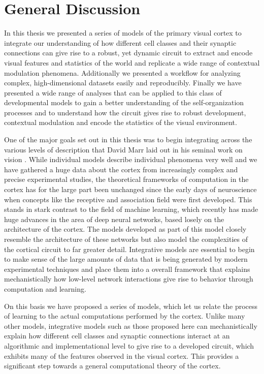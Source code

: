 \chapter{General Discussion}

In this thesis we presented a series of models of the primary visual
cortex to integrate our understanding of how different cell classes
and their synaptic connections can give rise to a robust, yet dynamic
circuit to extract and encode visual features and statistics of the
world and replicate a wide range of contextual modulation
phenomena. Additionally we presented a workflow for analyzing complex,
high-dimensional datasets easily and reproducibly. Finally we have
presented a wide range of analyses that can be applied to this class
of developmental models to gain a better understanding of the
self-organization processes and to understand how the circuit gives
rise to robust development, contextual modulation and encode the
statistics of the visual environment.

One of the major goals set out in this thesis was to begin integrating
across the various levels of description that David Marr laid out in
his seminal work on vision \citep{Marr1982}. While individual models
describe individual phenomena very well and we have gathered a huge
data about the cortex from increasingly complex and precise
experimental studies, the theoretical frameworks of computation in the
cortex has for the large part been unchanged since the early days of
neuroscience when concepts like the receptive and association field
were first developed. This stands in stark contrast to the field of
machine learning, which recently has made huge advances in the area of
deep neural networks, based losely on the architecture of the
cortex. The models developed as part of this model closely resemble
the architecture of these networks but also model the complexities of
the cortical circuit to far greater detail. Integrative models are
essential to begin to make sense of the large amounts of data that is
being generated by modern experimental techniques and place them into
a overall framework that explains mechanistically how low-level
network interactions give rise to behavior through computation and
learning.

On this basis we have proposed a series of models, which let us relate
the process of learning to the actual computations performed by the
cortex. Unlike many other models, integrative models such as those
proposed here can mechanistically explain how different cell classes
and synaptic connections interact at an algorithmic and
implementational level to give rise to a developed circuit, which
exhibits many of the features observed in the visual cortex. This
provides a significant step towards a general computational theory of
the cortex.

